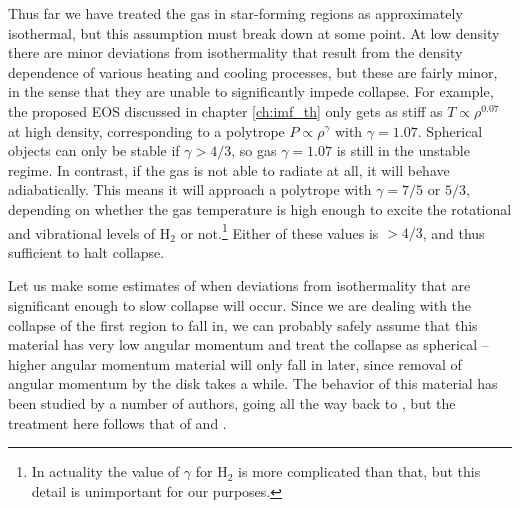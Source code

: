 Thus far we have treated the gas in star-forming regions as approximately isothermal, but this assumption must break down at some point. At low density there are minor deviations from isothermality that result from the density dependence of various heating and cooling processes, but these are fairly minor, in the sense that they are unable to significantly impede collapse. For example, the proposed \citet{larson05a} EOS discussed in chapter \ref{ch:imf_th} only gets as stiff as $T\propto \rho^{0.07}$ at high density, corresponding to a polytrope $P\propto \rho^{\gamma}$ with $\gamma=1.07$. Spherical objects can only be stable if $\gamma>4/3$, so gas $\gamma=1.07$ is still in the unstable regime. In contrast, if the gas is not able to radiate at all, it will behave adiabatically. This means it will approach a polytrope with $\gamma=7/5$ or $5/3$, depending on whether the gas temperature is high enough to excite the rotational and vibrational levels of H$_2$ or not.\footnote{In actuality the value of $\gamma$ for H$_2$ is more complicated than that, but this detail is unimportant for our purposes.} Either of these values is $>4/3$, and thus sufficient to halt collapse.

Let us make some estimates of when deviations from isothermality that are significant enough to slow collapse will occur. Since we are dealing with the collapse of the first region to fall in, we can probably safely assume that this material has very low angular momentum and treat the collapse as spherical -- higher angular momentum material will only fall in later, since removal of angular momentum by the disk takes a while. The behavior of this material has been studied by a number of authors, going all the way back to \citet{larson69a}, but the treatment here follows that of \citet{masunaga98a} and \citet{masunaga00a}.

